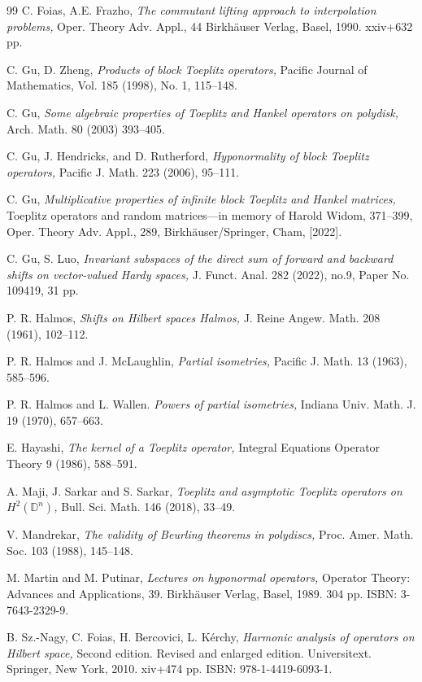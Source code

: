 \documentclass[12pt]{amsart}
\theoremstyle{definition}
\newcommand{\D}{\mathbb{D}}
\newcommand{\1}{{\mbox{\bf 1}}}
\begin{document}
\begin{thebibliography}{99}
C. Foias, A.E. Frazho, 
\emph{The commutant lifting approach to interpolation problems,}
Oper. Theory Adv. Appl., 44
Birkhäuser Verlag, Basel, 1990. xxiv+632 pp.

C. Gu, D. Zheng,
\emph{Products of block Toeplitz operators,} Pacific Journal of Mathematics, 
Vol. 185 (1998), No. 1, 115--148.

C. Gu, 
\emph{Some algebraic properties of Toeplitz
and Hankel operators on polydisk,}
Arch. Math. 80 (2003) 393--405.

C. Gu, J. Hendricks, and D. Rutherford, \emph{Hyponormality of block Toeplitz operators,} Pacific J. Math. 223 (2006), 95--111.

C. Gu, 
\emph{Multiplicative properties of infinite block Toeplitz and Hankel matrices,} Toeplitz operators and random matrices—in memory of Harold Widom, 371--399,
Oper. Theory Adv. Appl., 289, Birkhäuser/Springer, Cham, [2022].

C. Gu, S. Luo,
\emph{Invariant subspaces of the direct sum of forward and backward shifts on vector-valued Hardy spaces,} J. Funct. Anal. 282 (2022), no.9, Paper No. 109419, 31 pp.

P. R. Halmos,
\emph{Shifts on Hilbert spaces
Halmos,} J. Reine Angew. Math. 208 (1961), 102--112.

P. R. Halmos and J. McLaughlin, 
\emph{Partial isometries,} Pacific J. Math. 13 (1963), 585--596.

P. R. Halmos and L. Wallen. 
\emph{Powers of partial isometries,} Indiana Univ. Math. J. 19 (1970), 657--663.

E. Hayashi,
\emph{The kernel of a Toeplitz operator,}
Integral Equations Operator Theory 9 (1986),
588--591.

A. Maji, J. Sarkar and S. Sarkar, 
\emph{Toeplitz and asymptotic Toeplitz operators on $H^2(\D^n)$,} Bull. Sci. Math. 146 (2018), 33--49.

V. Mandrekar, 
\emph{The validity of Beurling theorems in polydiscs,} Proc. Amer. Math. Soc. 103 (1988), 145--148.

M. Martin and M. Putinar,
\emph{Lectures on hyponormal operators,}
Operator Theory: Advances and Applications, 39. Birkhäuser Verlag, Basel, 1989. 304 pp. ISBN: 3-7643-2329-9.

B. Sz.-Nagy, C. Foias, H. Bercovici, L. K\'erchy,
\emph{Harmonic analysis of operators on Hilbert space,} Second edition. Revised and enlarged edition. Universitext. Springer, New York, 2010. xiv+474 pp. ISBN: 978-1-4419-6093-1.


\end{thebibliography}
\end{document}
